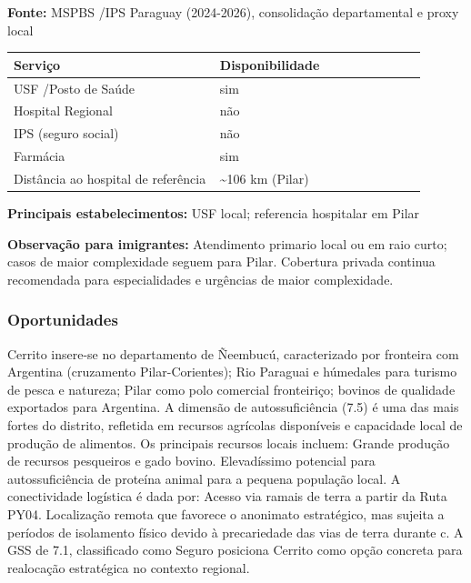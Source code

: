 \textbf{Fonte:} MSPBS /\allowbreak  IPS Paraguay (2024-2026), consolidação
departamental e proxy local

{\def\LTcaptype{none} %
\begin{longtable}{@{}>{\raggedright\arraybackslash}p{0.45\linewidth} >{\raggedright\arraybackslash}p{0.45\linewidth}@{}}
\toprule\noalign{}
Serviço & Disponibilidade \\
\midrule\noalign{}
\endhead
\bottomrule\noalign{}
\endlastfoot
USF /\allowbreak  Posto de Saúde & sim \\
Hospital Regional & não \\
IPS (seguro social) & não \\
Farmácia & sim \\
Distância ao hospital de referência & \textasciitilde106 km (Pilar) \\
\end{longtable}
}

\textbf{Principais estabelecimentos:} USF local; referencia hospitalar
em Pilar

\textbf{Observação para imigrantes:} Atendimento primario local ou em
raio curto; casos de maior complexidade seguem para Pilar. Cobertura
privada continua recomendada para especialidades e urgências de maior
complexidade.
\newpage

\subsubsection*{Oportunidades}\label{oport-cerrito-1203}
Cerrito insere-se no departamento de Ñeembucú, caracterizado por fronteira com Argentina (cruzamento Pilar-Corientes); Rio Paraguai e húmedales para turismo de pesca e natureza; Pilar como polo comercial fronteiriço; bovinos de qualidade exportados para Argentina. A dimensão de autossuficiência (7.5) é uma das mais fortes do distrito, refletida em recursos agrícolas disponíveis e capacidade local de produção de alimentos. Os principais recursos locais incluem: Grande produção de recursos pesqueiros e gado bovino. Elevadíssimo potencial para autossuficiência de proteína animal para a pequena população local. A conectividade logística é dada por: Acesso via ramais de terra a partir da Ruta PY04. Localização remota que favorece o anonimato estratégico, mas sujeita a períodos de isolamento físico devido à precariedade das vias de terra durante c. A GSS de 7.1, classificado como Seguro posiciona Cerrito como opção concreta para realocação estratégica no contexto regional.

